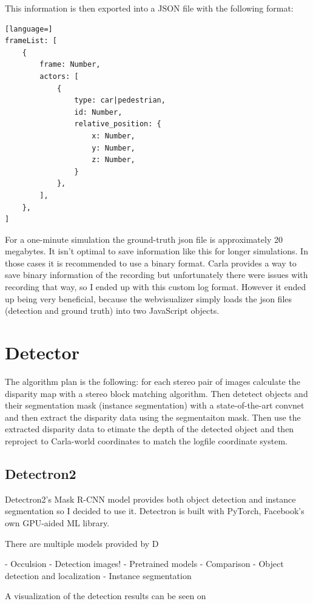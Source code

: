 This information is then exported into a JSON file with the following format:
\begin{lstlisting}[language=]
frameList: [
    {
        frame: Number,
        actors: [
            {
                type: car|pedestrian,
                id: Number,
                relative_position: {
                    x: Number,
                    y: Number,
                    z: Number,
                }
            },
        ],
    },
]
\end{lstlisting}

For a one-minute simulation the ground-truth json file is approximately 20
megabytes. It isn't optimal to save information like this for longer
simulations. In those cases it is recommended to use a binary format. Carla
provides a way to save binary information of the recording but unfortunately
there were issues with recording that way, so I ended up with this custom log
format. However it ended up being very beneficial, because the webvisualizer
simply loads the json files (detection and ground truth) into two JavaScript
objects.

\section{Detector}

The algorithm plan is the following: for each stereo pair of images calculate
the disparity map with a stereo block matching algorithm. Then detetect objects
and their segmentation mask (instance segmentation) with a state-of-the-art
convnet and then extract the disparity data using the segmentaiton mask. Then
use the extracted disparity data to etimate the depth of the detected object and
then reproject to Carla-world coordinates to match the logfile coordinate
system.

\subsection{Detectron2}
Detectron2's\cite{wu2019detectron2} Mask R-CNN model provides both object
detection and instance segmentation so I decided to use it. Detectron is built
with PyTorch, Facebook's own GPU-aided ML library.

There are multiple models provided by D

- Occulsion - Detection images! - Pretrained models - Comparison -
Object detection and localization - Instance segmentation

A visualization of the detection results can be seen on 

